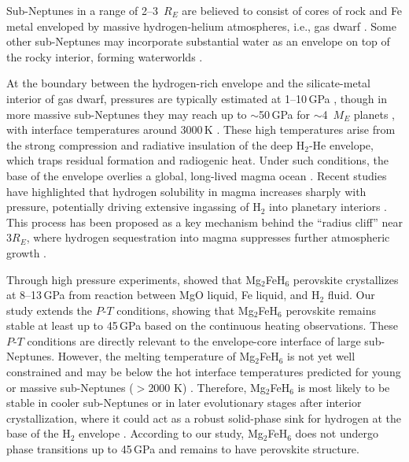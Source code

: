 \documentclass[draft,jgrga,12pt]{agujournal2019}
\begin{document}
Sub-Neptunes in a range of 2--3~$R_{E}$ are believed to consist of cores of rock and Fe metal enveloped by massive hydrogen-helium atmospheres, i.e., gas dwarf \cite{wolfgang_how_2015, jontof-hutter_secure_2016}.  
Some other sub-Neptunes may incorporate substantial water as an envelope on top of the rocky interior, forming waterworlds \cite{luque_density_2022, tsiaras_water_2019, benneke_water_2019, burn_radius_2024, venturini_nature_2020}.

At the boundary between the hydrogen-rich envelope and the silicate-metal interior of gas dwarf, pressures are typically estimated at 1--10\,{GPa} \cite{kite_superabundance_2019, kite_atmosphere_2020}, though in more massive sub-Neptunes they may reach up to $\sim$50\,{GPa} for $\sim$4~$M_{E}$ planets \cite{schlichting_chemical_2022}, with interface temperatures around 3000\,K \cite{horn_building_2025}. 
These high temperatures arise from the strong compression and radiative insulation of the deep H$_2$-He envelope, which traps residual formation and radiogenic heat.
Under such conditions, the base of the envelope overlies a global, long-lived magma ocean \cite{vazan_contribution_2018,vazan_rocky_2023, kite_atmosphere_2020, schlichting_chemical_2022}. 
Recent studies have highlighted that hydrogen solubility in magma increases sharply with pressure, potentially driving extensive ingassing of H$_2$ into planetary interiors \cite{hirschmann_solubility_2012, olson_nebular_2019,kimura_predicted_2022, young_phase_2024, gilmore_core_2026}. 
This process has been proposed as a key mechanism behind the ``radius cliff'' near $3R_{E}$, where hydrogen sequestration into magma suppresses further atmospheric growth \cite{kite_superabundance_2019, kim_stability_2023}.

Through high pressure experiments,  showed that Mg$_2$FeH$_6$ perovskite crystallizes at 8--13\,{GPa} from reaction between MgO liquid, Fe liquid, and H$_2$ fluid. 
Our study extends the $P$-$T$ conditions, showing that Mg$_2$FeH$_6$ perovskite remains stable at least up to 45\,{GPa} based on the continuous heating observations.
These $P$-$T$ conditions are directly relevant to the envelope-core interface of large sub-Neptunes. %
However, the melting temperature of Mg$_2$FeH$_6$ is not yet well constrained and may be below the hot interface temperatures predicted for young or massive sub-Neptunes ($>$2000 K) \cite{kite_atmosphere_2020}. 
Therefore, Mg$_2$FeH$_6$ is most likely to be stable in cooler sub-Neptunes or in later evolutionary stages after interior crystallization, where it could act as a robust solid-phase sink for hydrogen at the base of the H$_2$ envelope \cite{kim_stability_2023}. 
According to our study, Mg$_2$FeH$_6$ does not undergo phase transitions up to 45\,{GPa} and remains to have perovskite structure. 
\end{document}
